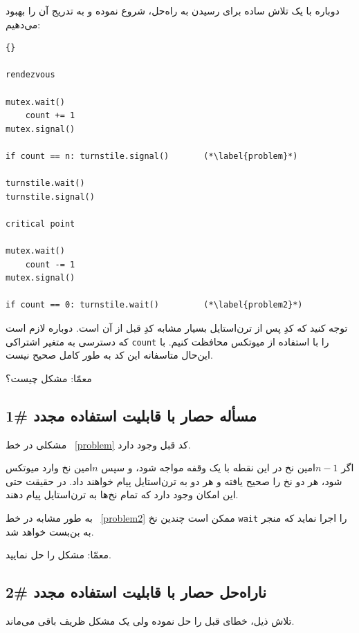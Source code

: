 \documentclass{book}
\newcommand{\clearemptydoublepage}{\newpage\cleardoublepage}
\begin{document}
    دوباره با یک تلاش ساده برای رسیدن به راه‌حل، شروع نموده و به تدریج آن را بهبود می‌دهیم:

\begin{latin}
\begin{lstlisting}[title=\rl{  ناراه‌حل حصار با قابلیت استفاده مجدد}]{} 

rendezvous

mutex.wait()
    count += 1
mutex.signal()

if count == n: turnstile.signal()       (*\label{problem}*)

turnstile.wait()
turnstile.signal()

critical point

mutex.wait()
    count -= 1
mutex.signal()

if count == 0: turnstile.wait()         (*\label{problem2}*)
\end{lstlisting}
\end{latin}

    توجه کنید که کدِ پس از تر‌ن‌استایل بسیار مشابه کدِ قبل از آن است. دوباره لازم است که دسترسی به متغیر اشتراکی \texttt{count} را 
    با استفاده از میوتکس محافظت کنیم. با این‌حال متاسفانه این کد به طور کامل صحیح نیست. 

    معمّا: مشکل چیست؟


\clearemptydoublepage
\subsection{ مسأله حصار با قابلیت استفاده مجدد  \#1}

  مشکلی در خط ~\ref{problem} کد قبل وجود دارد. 

    اگر $n-1$امین نخ در این نقطه با یک وقفه مواجه شود، و سپس $n$امین نخ وارد میوتکس شود، هر دو نخ  
    را صحیح یافته و هر دو به ترن‌استایل پیام خواهند داد. در حقیقت حتی این امکان وجود دارد که تمام نخ‌ها به ترن‌استایل پیام دهند. 

    به طور مشابه در خط ~\ref{problem2} ممکن است چندین نخ \texttt{wait}  را اجرا نماید که منجر به بن‌بست خواهد شد. 

    معمّا: مشکل را حل نمایید. 

\clearemptydoublepage
\subsection {  ناراه‌حل حصار با قابلیت استفاده مجدد \#2}

    تلاش ذیل، خطای قبل را حل نموده ولی یک مشکل ظریف باقی می‌ماند. 
\end{document}
